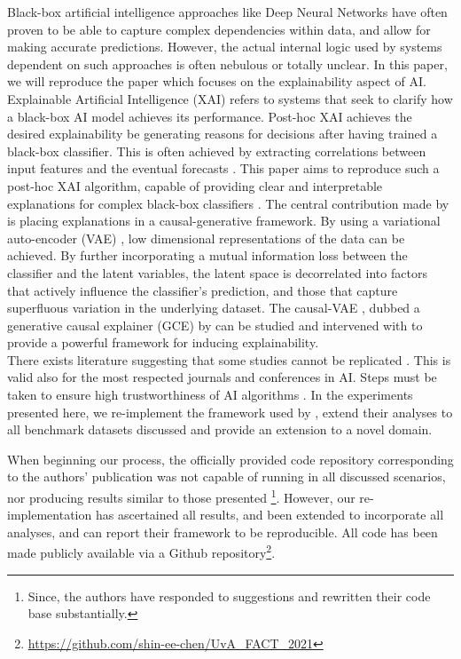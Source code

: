 Black-box artificial intelligence approaches like Deep Neural Networks have often proven to be able to capture complex dependencies within data, and allow for making accurate predictions. However, the actual internal logic used by systems dependent on such approaches is often nebulous or totally unclear.  In this paper, we will reproduce the paper which focuses on the explainability aspect of AI.\\

Explainable Artificial Intelligence (XAI) refers to systems that seek to clarify how a black-box AI model achieves its performance. Post-hoc XAI achieves the desired explainability be generating reasons for decisions after having trained a black-box classifier. This is often achieved by extracting correlations between input features and the eventual forecasts \cite{moradi2021post}. This paper aims to reproduce such a post-hoc XAI algorithm, capable of providing clear and interpretable explanations for complex black-box classifiers \cite{oshaughnessy2020generative}. The central contribution made by \cite{oshaughnessy2020generative} is placing explanations in a causal-generative framework. By using a variational auto-encoder (VAE) \cite{kingma2014autoencoding} , low dimensional representations of the data can be achieved. By further incorporating a mutual information loss between the classifier and the latent variables, the latent space is decorrelated into factors that actively influence the classifier's prediction, and those that capture superfluous variation in the underlying dataset. The causal-VAE , dubbed a generative causal explainer (GCE) by \cite{oshaughnessy2020generative} can be studied and intervened with to provide a powerful framework for inducing explainability.\\

There exists literature suggesting that some studies cannot be replicated \cite{Hutson725}. This is valid also for the most respected journals and conferences in AI. Steps must be taken to ensure high trustworthiness of AI algorithms \cite{gundersen2018state}. In the experiments presented here, we re-implement the framework used by \cite{oshaughnessy2020generative}, extend their analyses to all benchmark datasets discussed and provide an extension to a novel domain.

When beginning our process, the officially provided code repository corresponding to the authors' publication was not capable of running in all discussed scenarios, nor producing results similar to those presented \footnote{Since, the authors have responded to suggestions and rewritten their code base substantially.}. However, our re-implementation has ascertained all results, and been extended to incorporate all analyses, and can report their framework to be reproducible.
All code has been made publicly available via a Github repository\footnote{\url{https://github.com/shin-ee-chen/UvA_FACT_2021}}.

